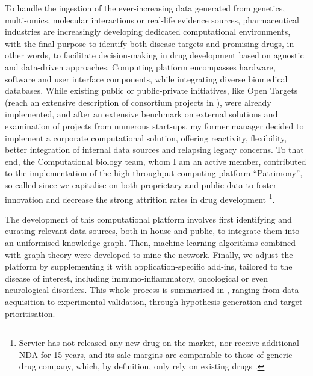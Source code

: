 To handle the ingestion of the ever-increasing data generated from genetics, multi-omics, molecular interactions or real-life evidence sources, pharmaceutical industries are increasingly developing dedicated computational environments, with the final purpose to identify both disease targets and promising drugs, in other words, to facilitate decision-making in drug development based on agnostic and data-driven approaches. Computing platform encompasses hardware, software and user interface components, while integrating diverse biomedical databases. 
While existing public or public-private initiatives, like Open Targets \autocite{koscielny_etal17} (reach an extensive description of consortium projects in \autocite[Supp. Table 2]{guedj_etal22}), were already implemented, and after an extensive benchmark on external solutions and examination of projects from numerous start-ups, my former manager decided to implement a corporate computational solution, offering reactivity, flexibility, better integration of internal data sources and relapsing legacy concerns. To that end, the Computational biology team, whom I am an active member, contributed to the implementation of the high-throughput computing platform \enquote{Patrimony}, so called since we capitalise on both proprietary and public data to foster innovation and decrease the strong attrition rates in drug development \footnote{Servier has not released any new drug on the market, nor receive additional NDA for 15 years, and its sale margins are comparable to those of generic drug company, which, by definition, only rely on existing drugs \autocite{guerre16}.}.


The development of this computational platform involves first identifying and curating relevant data sources, both in-house and public, to integrate them into an uniformised knowledge graph. Then, machine-learning algorithms combined with graph theory were developed to mine the network. Finally, we adjust the platform by supplementing it with application-specific add-ins, tailored to the disease of interest, including immuno-inflammatory, oncological or even neurological disorders. This whole process is summarised in , ranging from data acquisition to experimental validation, through hypothesis generation and target prioritisation.

